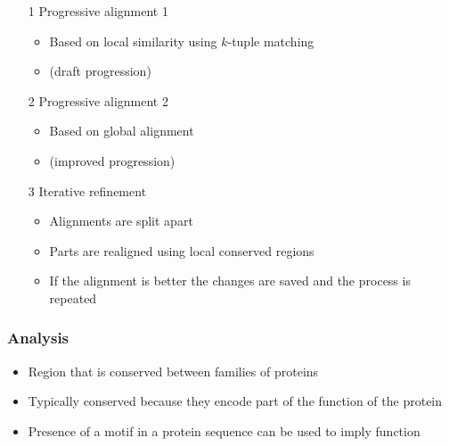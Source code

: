 \documentclass[a4paper]{article}
\begin{document}
\begin{itemize}
  \item[1]
    Progressive alignment 1

    \begin{itemize}
      \item
        Based on local similarity using $k$-tuple matching

      \item
        (draft progression)
    \end{itemize}

  \item[2]
    Progressive alignment 2

    \begin{itemize}
      \item
        Based on global alignment

      \item
        (improved progression)
    \end{itemize}

  \item[3]
    Iterative refinement

    \begin{itemize}
      \item
        Alignments are split apart

      \item
        Parts are realigned using local conserved regions

      \item
        If the alignment is better the changes are saved and the process is
        repeated
    \end{itemize}
\end{itemize}

\subsubsection{Analysis}


\begin{itemize}
  \item
    Region that is conserved between families of proteins

  \item
    Typically conserved because they encode part of the function of the protein

  \item
    Presence of a motif in a protein sequence can be used to imply function
\end{itemize}
\end{document}
